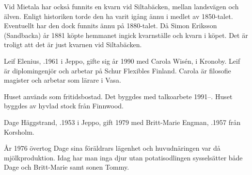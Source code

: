 Vid Mietala har också funnits en kvarn vid Siltabäcken, mellan landsvägen och älven. Enligt historiken torde den ha varit igång ännu i medlet av 1850-talet. Eventuellt har den dock funnits ännu på 1880-talet. Då Simon Eriksson (Sandbacka) år 1881 köpte hemmanet ingick kvarnställe och kvarn  i köpet. Det är troligt att det är just kvarnen vid Siltabäcken.



%



%
Leif Elenius, .1961 i Jeppo, gifte sig år 1990 med Carola Wisén,  i Kronoby. Leif är diplomingenjör och arbetar på Schur Flexibles Finland. Carola är filosofie magister och arbetar som lärare i Vasa.

\begin{jhchildren}
  \item {}
  \item {}
  \item {}
\end{jhchildren}

Huset används som fritidsbostad. Det byggdes med talkoarbete 1991--. Huset byggdes av hyvlad stock från Finnwood.



%



%
Dage Häggstrand, .1953 i Jeppo, gift 1979 med Britt-Marie Engman, .1957 från Korsholm.
\begin{jhchildren}
  \item {}
  \item {}
\end{jhchildren}

År 1976 övertog Dage sina föräldrars lägenhet och huvudnäringen var då mjölkproduktion. Idag har man inga djur utan potatisodlingen sysselsätter både Dage och Britt-Marie samt sonen Tommy.

